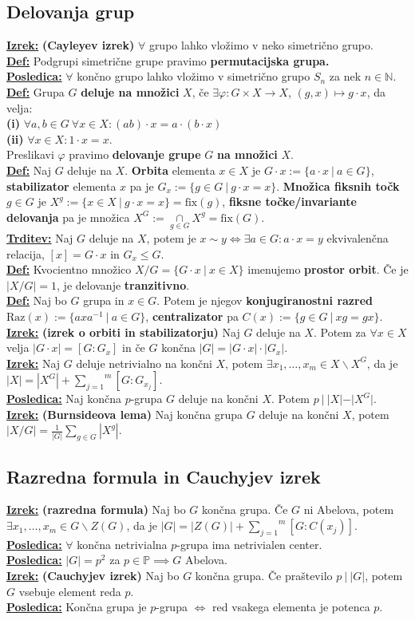 \documentclass[a4paper,oneside,8pt,landscape]{extarticle}
\renewcommand{\phi}{\varphi}
\let\oldtextbf\textbf
\renewcommand{\textbf}[1]{\oldtextbf{\boldmath #1}}
\newcommand{\definicija}[1]{\textbf{\underline{Def:} }{#1}\\}
\newcommand{\trditev}[1]{\textbf{\underline{Trditev:} }{#1}\\}
\newcommand{\posledica}[1]{\textbf{\underline{Posledica:} }{#1}\\}
\newcommand{\izrek}[1]{\textbf{\underline{Izrek:} }{#1}\\}
\newcommand{\bt}[1]{\textbf{#1}}
\begin{document}
\begin{multicols*}{3}
\subsection*{Delovanja grup}
\izrek{\bt{(Cayleyev izrek)} $\forall$ grupo lahko vložimo v neko simetrično grupo.}
\definicija{Podgrupi simetrične grupe pravimo \bt{permutacijska grupa.}}
\posledica{$\forall$ končno grupo lahko vložimo v simetrično grupo $S_n$ za nek $n\in \mathbb{N}$.}
\definicija{Grupa $G$ \bt{deluje na množici} $X$, če $\exists \phi :G\times X \to X$, $(g,x) \mapsto g \cdot x$, da velja: \\
\bt{(i)} $\forall a,b\in G \ \forall x\in X: (ab)\cdot x = a\cdot (b\cdot x)$ \\
\bt{(ii)} $\forall x\in X: 1\cdot x= x$. \\
Preslikavi $\phi$ pravimo \bt{delovanje grupe} $G$ \bt{na množici} $X$.}
\definicija{Naj $G$ deluje na $X$. \bt{Orbita} elementa $x\in X$ je $G\cdot x := \{a\cdot x \ | \ a\in G\}$, \bt{stabilizator} elementa $x$ pa je $G_x := \{g\in G \ | \ g\cdot x = x\}$. \bt{Množica fiksnih točk} $g\in G$ je $X^g := \{x\in X \ | \ g \cdot x= x\} = \text{fix}(g)$, \bt{fiksne točke/invariante delovanja} pa je množica $X^G := \underset{g\in G}{\cap}X^g = \text{fix}(G)$.}
\trditev{Naj $G$ deluje na $X$, potem je $x\sim y \iff \exists a\in G:a\cdot x = y$ ekvivalenčna relacija, $[x] = G\cdot x$ in $G_x \leq G$.}
\definicija{Kvocientno množico $X/G = \{ G\cdot x \ | \ x\in X\}$ imenujemo \bt{prostor orbit}. Če je $|X/G| = 1$, je delovanje \bt{tranzitivno}.}
\definicija{Naj bo $G$ grupa in $x\in G$. Potem je njegov \bt{konjugiranostni razred} $\text{Raz}(x) := \{axa^{-1} \ | \ a\in G\}$, \bt{centralizator} pa $C(x) := \{g\in G \ | \ xg = gx\}$.}
\izrek{\bt{(izrek o orbiti in stabilizatorju) } Naj $G$ deluje na $X$. Potem za $\forall x\in X$ velja $|G\cdot x| = [G:G_x]$ in če $G$ končna $|G| = |G\cdot x| \cdot |G_x|$.}
\izrek{Naj $G$ deluje netrivialno na končni $X$, potem $\exists x_1,\dots,x_m\in X\backslash X^G$, da je $|X| = |X^G| + \overset{m}{\underset{j=1}{\sum}}[G:G_{x_j}]$.}
\posledica{Naj končna $p$-grupa $G$ deluje na končni $X$. Potem $p \ | \ |X| - |X^G|$.}
\izrek{\bt{(Burnsideova lema)} Naj končna grupa $G$ deluje na končni $X$, potem $|X/G|=\frac{1}{|G|} \underset{g\in G}{\sum}|X^g|$.}
\vspace{-15pt}
\subsection*{Razredna formula in Cauchyjev izrek}
\izrek{\bt{(razredna formula)} Naj bo $G$ končna grupa. Če $G$ ni Abelova, potem $\exists x_1,\dots,x_m\in G\backslash Z(G)$, da  je $|G| = |Z(G)| + \overset{m}{\underset{j=1}{\sum}}[G:C(x_j)]$.}
\posledica{$\forall$ končna netrivialna $p$-grupa ima netrivialen center.}
\posledica{$|G| = p^2$ za $p\in\mathbb{P} \implies G$ Abelova.}
\izrek{\bt{(Cauchyjev izrek) } Naj bo $G$ končna grupa. Če praštevilo $p \ | \ |G|$, potem $G$ vsebuje element reda $p$.}
\posledica{Končna grupa je $p$-grupa $\iff$ red vsakega elementa je potenca $p$.}
\vspace{-15pt}

\end{multicols*}
\end{document}
